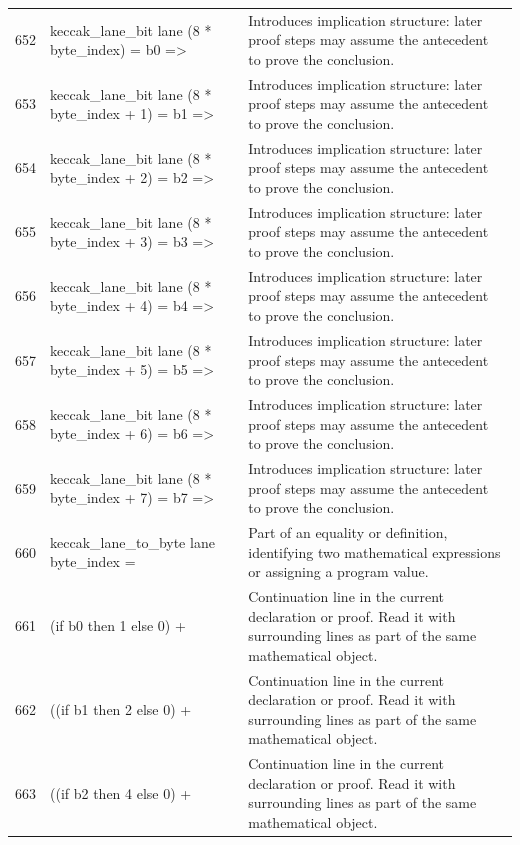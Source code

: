\documentclass[10pt]{article}
\begin{document}
\begin{longtable}{r L{0.53\textwidth} L{0.37\textwidth}}
652 & {\ttfamily\scriptsize   keccak\_lane\_bit lane (8 * byte\_index) = b0 =>} & Introduces implication structure: later proof steps may assume the antecedent to prove the conclusion. \\
653 & {\ttfamily\scriptsize   keccak\_lane\_bit lane (8 * byte\_index + 1) = b1 =>} & Introduces implication structure: later proof steps may assume the antecedent to prove the conclusion. \\
654 & {\ttfamily\scriptsize   keccak\_lane\_bit lane (8 * byte\_index + 2) = b2 =>} & Introduces implication structure: later proof steps may assume the antecedent to prove the conclusion. \\
655 & {\ttfamily\scriptsize   keccak\_lane\_bit lane (8 * byte\_index + 3) = b3 =>} & Introduces implication structure: later proof steps may assume the antecedent to prove the conclusion. \\
656 & {\ttfamily\scriptsize   keccak\_lane\_bit lane (8 * byte\_index + 4) = b4 =>} & Introduces implication structure: later proof steps may assume the antecedent to prove the conclusion. \\
657 & {\ttfamily\scriptsize   keccak\_lane\_bit lane (8 * byte\_index + 5) = b5 =>} & Introduces implication structure: later proof steps may assume the antecedent to prove the conclusion. \\
658 & {\ttfamily\scriptsize   keccak\_lane\_bit lane (8 * byte\_index + 6) = b6 =>} & Introduces implication structure: later proof steps may assume the antecedent to prove the conclusion. \\
659 & {\ttfamily\scriptsize   keccak\_lane\_bit lane (8 * byte\_index + 7) = b7 =>} & Introduces implication structure: later proof steps may assume the antecedent to prove the conclusion. \\
660 & {\ttfamily\scriptsize   keccak\_lane\_to\_byte lane byte\_index =} & Part of an equality or definition, identifying two mathematical expressions or assigning a program value. \\
661 & {\ttfamily\scriptsize   (if b0 then 1 else 0) +} & Continuation line in the current declaration or proof.  Read it with surrounding lines as part of the same mathematical object. \\
662 & {\ttfamily\scriptsize   ((if b1 then 2 else 0) +} & Continuation line in the current declaration or proof.  Read it with surrounding lines as part of the same mathematical object. \\
663 & {\ttfamily\scriptsize   ((if b2 then 4 else 0) +} & Continuation line in the current declaration or proof.  Read it with surrounding lines as part of the same mathematical object. \\

\end{longtable}
\end{document}
